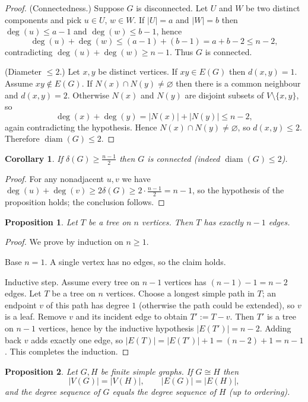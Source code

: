 \documentclass{article}
\theoremstyle{plain}
\newtheorem{proposition}{Proposition}
\newtheorem{corollary}{Corollary}
\theoremstyle{definition}
\theoremstyle{remark}
\begin{document}
\begin{proof}
(Connectedness.) Suppose $G$ is disconnected. Let $U$ and $W$ be two distinct
components and pick $u\in U$, $w\in W$. If $|U|=a$ and $|W|=b$ then
$\deg(u)\le a-1$ and $\deg(w)\le b-1$, hence
\[
\deg(u)+\deg(w)\le (a-1)+(b-1)=a+b-2\le n-2,
\]
contradicting $\deg(u)+\deg(w)\ge n-1$. Thus $G$ is connected.

(Diameter $\le2$.) Let $x,y$ be distinct vertices. If $xy\in E(G)$ then
$d(x,y)=1$. Assume $xy\notin E(G)$. If $N(x)\cap N(y)\neq\varnothing$ then
there is a common neighbour and $d(x,y)=2$. Otherwise $N(x)$ and $N(y)$ are
disjoint subsets of $V\setminus\{x,y\}$, so
\[
\deg(x)+\deg(y)=|N(x)|+|N(y)|\le n-2,
\]
again contradicting the hypothesis. Hence $N(x)\cap N(y)\neq\varnothing$, so
$d(x,y)\le2$. Therefore $\operatorname{diam}(G)\le2$.
\end{proof}

\begin{corollary}
If $\delta(G)\ge\frac{n-1}{2}$ then $G$ is connected (indeed $\operatorname{diam}(G)\le2$).
\end{corollary}

\begin{proof}
For any nonadjacent $u,v$ we have
$\deg(u)+\deg(v)\ge 2\delta(G)\ge 2\cdot\frac{n-1}{2}=n-1$, so the hypothesis
of the proposition holds; the conclusion follows.
\end{proof}

\begin{proposition}
Let \(T\) be a tree on \(n\) vertices. Then \(T\) has exactly \(n-1\) edges.
\end{proposition}

\begin{proof}
We prove by induction on \(n\ge1\).

Base \(n=1\). A single vertex has no edges, so the claim holds.

Inductive step. Assume every tree on \(n-1\) vertices has \((n-1)-1=n-2\) edges.
Let \(T\) be a tree on \(n\) vertices. Choose a longest simple path in \(T\);
an endpoint \(v\) of this path has degree \(1\) (otherwise the path could be
extended), so \(v\) is a leaf. Remove \(v\) and its incident edge to obtain
\(T':=T-v\). Then \(T'\) is a tree on \(n-1\) vertices, hence by the
inductive hypothesis \(|E(T')|=n-2\). Adding back \(v\) adds exactly one
edge, so \(|E(T)|=|E(T')|+1=(n-2)+1=n-1\). This completes the induction.
\end{proof}

\begin{proposition}
Let $G,H$ be finite simple graphs. If $G\cong H$ then
\[
|V(G)|=|V(H)|,\qquad |E(G)|=|E(H)|,
\]
and the degree sequence of $G$ equals the degree sequence of $H$ (up to ordering).
\end{proposition}
\end{document}
